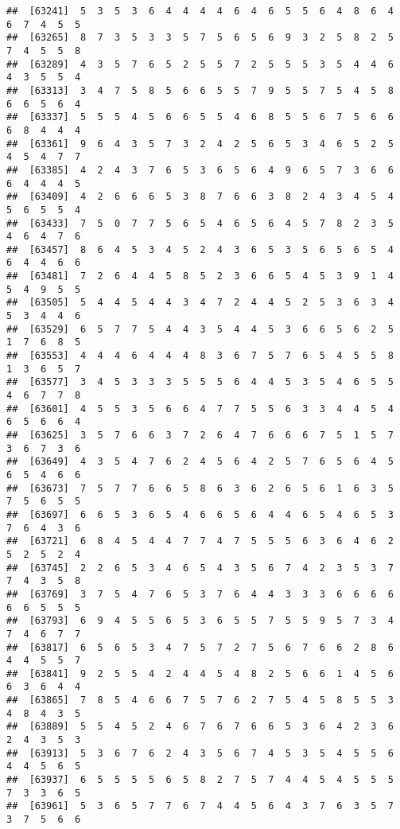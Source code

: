 \documentclass[
]{book}
\begin{document}
\begin{verbatim}
##  [63241]  5  3  5  3  6  4  4  4  4  6  4  6  5  5  6  4  8  6  4  6  7  4  5  5
##  [63265]  8  7  3  5  3  3  5  7  5  6  5  6  9  3  2  5  8  2  5  7  4  5  5  8
##  [63289]  4  3  5  7  6  5  2  5  5  7  2  5  5  5  3  5  4  4  6  4  3  5  5  4
##  [63313]  3  4  7  5  8  5  6  6  5  5  7  9  5  5  7  5  4  5  8  6  6  5  6  4
##  [63337]  5  5  5  4  5  6  6  5  5  4  6  8  5  5  6  7  5  6  6  6  8  4  4  4
##  [63361]  9  6  4  3  5  7  3  2  4  2  5  6  5  3  4  6  5  2  5  4  5  4  7  7
##  [63385]  4  2  4  3  7  6  5  3  6  5  6  4  9  6  5  7  3  6  6  6  4  4  4  5
##  [63409]  4  2  6  6  6  5  3  8  7  6  6  3  8  2  4  3  4  5  4  5  6  5  5  4
##  [63433]  7  5  0  7  7  5  6  5  4  6  5  6  4  5  7  8  2  3  5  4  6  4  7  6
##  [63457]  8  6  4  5  3  4  5  2  4  3  6  5  3  5  6  5  6  5  4  6  4  4  6  6
##  [63481]  7  2  6  4  4  5  8  5  2  3  6  6  5  4  5  3  9  1  4  5  4  9  5  5
##  [63505]  5  4  4  5  4  4  3  4  7  2  4  4  5  2  5  3  6  3  4  5  3  4  4  6
##  [63529]  6  5  7  7  5  4  4  3  5  4  4  5  3  6  6  5  6  2  5  1  7  6  8  5
##  [63553]  4  4  4  6  4  4  4  8  3  6  7  5  7  6  5  4  5  5  8  1  3  6  5  7
##  [63577]  3  4  5  3  3  3  5  5  5  6  4  4  5  3  5  4  6  5  5  4  6  7  7  8
##  [63601]  4  5  5  3  5  6  6  4  7  7  5  5  6  3  3  4  4  5  4  6  5  6  6  4
##  [63625]  3  5  7  6  6  3  7  2  6  4  7  6  6  6  7  5  1  5  7  3  6  7  3  6
##  [63649]  4  3  5  4  7  6  2  4  5  6  4  2  5  7  6  5  6  4  5  6  5  4  6  6
##  [63673]  7  5  7  7  6  6  5  8  6  3  6  2  6  5  6  1  6  3  5  7  5  6  5  5
##  [63697]  6  6  5  3  6  5  4  6  6  5  6  4  4  6  5  4  6  5  3  7  6  4  3  6
##  [63721]  6  8  4  5  4  4  7  7  4  7  5  5  5  6  3  6  4  6  2  5  2  5  2  4
##  [63745]  2  2  6  5  3  4  6  5  4  3  5  6  7  4  2  3  5  3  7  7  4  3  5  8
##  [63769]  3  7  5  4  7  6  5  3  7  6  4  4  3  3  3  6  6  6  6  6  6  5  5  5
##  [63793]  6  9  4  5  5  6  5  3  6  5  5  7  5  5  9  5  7  3  4  7  4  6  7  7
##  [63817]  6  5  6  5  3  4  7  5  7  2  7  5  6  7  6  6  2  8  6  4  4  5  5  7
##  [63841]  9  2  5  5  4  2  4  4  5  4  8  2  5  6  6  1  4  5  6  6  3  6  4  4
##  [63865]  7  8  5  4  6  6  7  5  7  6  2  7  5  4  5  8  5  5  3  4  8  4  3  5
##  [63889]  5  5  4  5  2  4  6  7  6  7  6  6  5  3  6  4  2  3  6  2  4  3  5  3
##  [63913]  5  3  6  7  6  2  4  3  5  6  7  4  5  3  5  4  5  5  6  4  4  5  6  5
##  [63937]  6  5  5  5  5  6  5  8  2  7  5  7  4  4  5  4  5  5  5  7  3  3  6  5
##  [63961]  5  3  6  5  7  7  6  7  4  4  5  6  4  3  7  6  3  5  7  3  7  5  6  6

\end{verbatim}
\end{document}
